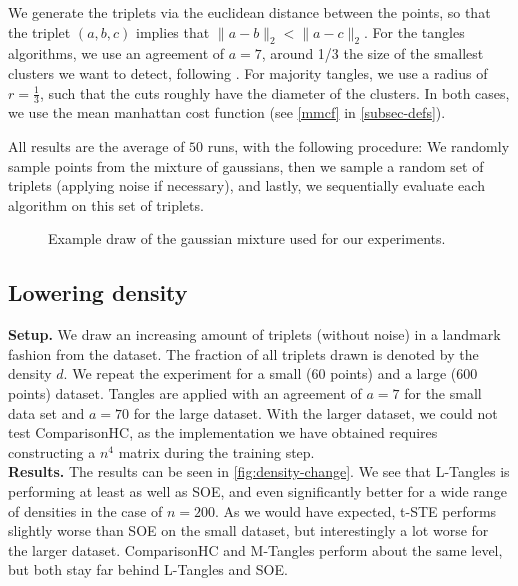 We generate the triplets via the euclidean distance between the points, so that
the triplet $(a,b,c)$ implies that $\|a - b\|_2 < \|a - c\|_2$. For the tangles algorithms, we use an agreement of $a=7$, around 1/3 the size of the smallest
clusters we want to detect, following \cite{klepperClusteringTanglesAlgorithmic2021}. For majority tangles, we use a radius of $r=\frac{1}{3}$, 
such that the cuts roughly have the diameter of the clusters. In both cases, we use the mean manhattan cost function (see \autoref{mmcf} in \autoref{subsec-defs}).

All results are the average of $50$ runs, with the following procedure: We randomly sample points from the mixture of gaussians, then we sample a random set of triplets
(applying noise if necessary), and lastly, we sequentially evaluate each algorithm on this set of triplets. 

\begin{figure}[ht]
    \centering
    \resizebox{0.8\textwidth}{!}{}
    \caption{Example draw of the gaussian mixture used for our experiments.}
    \label{fig:dataset-gauss}
\end{figure}

\subsection{Lowering density}\label{sec:lower-density}

\textbf{Setup.} 
We draw an increasing amount of triplets (without noise) in a landmark fashion from the dataset. 
The fraction of all triplets drawn is denoted by the density $d$.  We repeat the experiment for a small ($60$ points) and a large ($600$ points) dataset.
Tangles are applied with an agreement of $a=7$ for the small data set and $a=70$ for the large dataset.
With the larger dataset, we could not test ComparisonHC, as the implementation we have obtained requires 
constructing a $n^4$ matrix during the training step. \\

\noindent
\textbf{Results.} The results can be seen in \autoref{fig:density-change}.
We see that L-Tangles is performing at least as well as SOE, and even significantly better for a wide range of densities in the case of $n=200$. 
As we would have expected, t-STE performs slightly worse than SOE on the small dataset, but interestingly a lot worse for the larger dataset. ComparisonHC and M-Tangles
perform about the same level, but both stay far behind L-Tangles and SOE. 

